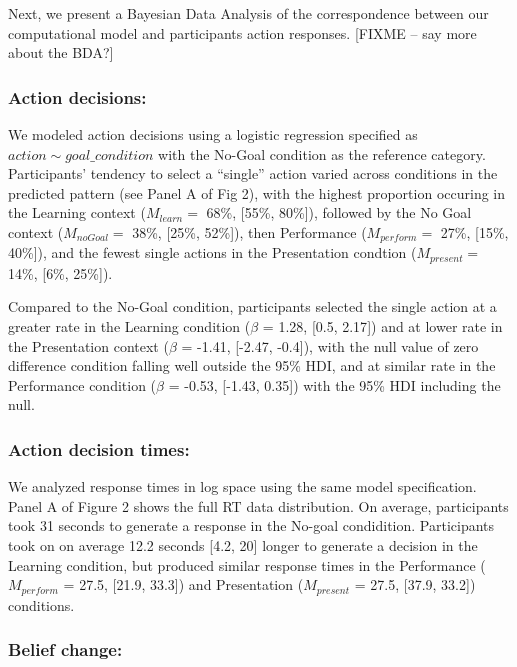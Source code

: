 \documentclass[10pt, letterpaper]{article}
\begin{document}
Next, we present a Bayesian Data Analysis of the correspondence between
our computational model and participants action responses. {[}FIXME --
say more about the BDA?{]}

\subsubsection{Action decisions:}\label{action-decisions}

We modeled action decisions using a logistic regression specified as
\texttt{$action \sim goal\_condition$} with the No-Goal condition as the
reference category. Participants' tendency to select a ``single'' action
varied across conditions in the predicted pattern (see Panel A of Fig
2), with the highest proportion occuring in the Learning context
(\(M_{learn} =\) 68\%, {[}55\%, 80\%{]}), followed by the No Goal
context (\(M_{noGoal} =\) 38\%, {[}25\%, 52\%{]}), then Performance
(\(M_{perform} =\) 27\%, {[}15\%, 40\%{]}), and the fewest single
actions in the Presentation condtion (\(M_{present} =\) 14\%, {[}6\%,
25\%{]}).

Compared to the No-Goal condition, participants selected the single
action at a greater rate in the Learning condition (\(\beta\) = 1.28,
{[}0.5, 2.17{]}) and at lower rate in the Presentation context
(\(\beta\) = -1.41, {[}-2.47, -0.4{]}), with the null value of zero
difference condition falling well outside the 95\% HDI, and at similar
rate in the Performance condition (\(\beta\) = -0.53, {[}-1.43, 0.35{]})
with the 95\% HDI including the null.

\subsubsection{Action decision times:}\label{action-decision-times}

We analyzed response times in log space using the same model
specification. Panel A of Figure 2 shows the full RT data distribution.
On average, participants took 31 seconds to generate a response in the
No-goal condidition. Participants took on on average 12.2 seconds
{[}4.2, 20{]} longer to generate a decision in the Learning condition,
but produced similar response times in the Performance (\(M_{perform}\)
= 27.5, {[}21.9, 33.3{]}) and Presentation (\(M_{present}\) = 27.5,
{[}37.9, 33.2{]}) conditions.

\subsubsection{Belief change:}\label{belief-change}
\end{document}
